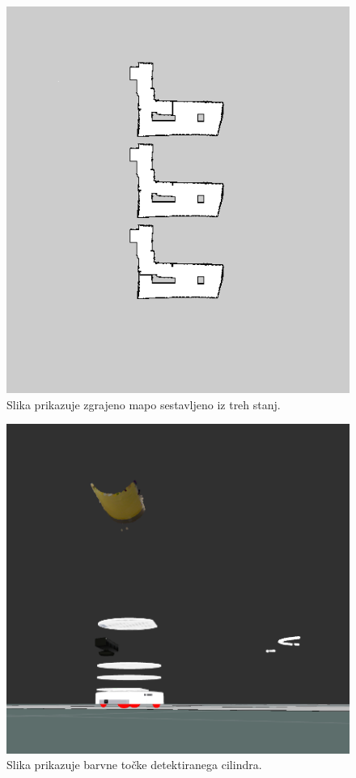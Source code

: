 \documentclass{llncs}
\begin{document}
\begin{figure}
  \centering
    \includegraphics[width=1\textwidth]{aze.png}
  \caption{Slika prikazuje zgrajeno mapo sestavljeno iz treh stanj.}
  \label{div}
\end{figure}


\begin{figure}
  \centering
    \includegraphics[width=1\textwidth]{cil.png}
  \caption{Slika prikazuje barvne točke detektiranega cilindra.}
  \label{cil}
\end{figure}
\end{document}
